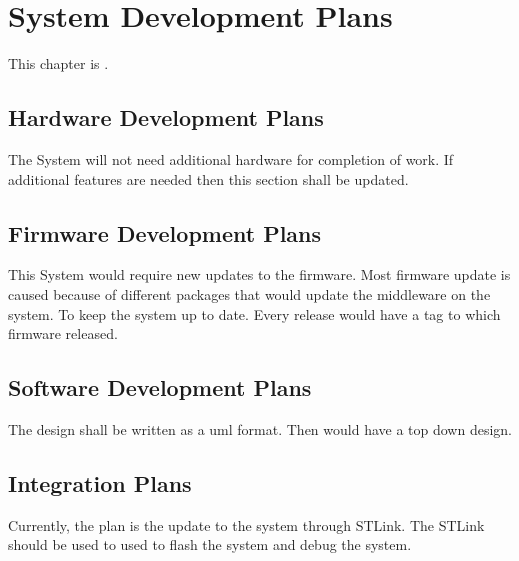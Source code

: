 
\chapter{System Development Plans}
\label{loc:PlansForSystemDevelopment}
% 

This chapter is \TBD.

\section{Hardware Development Plans}
\label{loc:SDP_HardwareDevelopmentPlans}
% 

The System will not need additional hardware for completion of work. If additional features are needed then this section shall be updated.

\section{Firmware Development Plans}
\label{loc:SDP_FirmwareDevelopmentPlans}
% 

This System would require new updates to the firmware. Most firmware update is caused because of different packages that would update the middleware on the system.
To keep the system up to date. Every release would have a tag to which firmware released.


\section{Software Development Plans}
\label{loc:SDP_SoftwareDevelopmentPlans}
% 

The design shall be written as a uml format. Then would have a top down design.

\section{Integration Plans}
\label{loc:SDP_IntegrationPlans}
% 

Currently, the plan is the update to the system through STLink. The STLink should be used to used to flash the system and debug the system.


